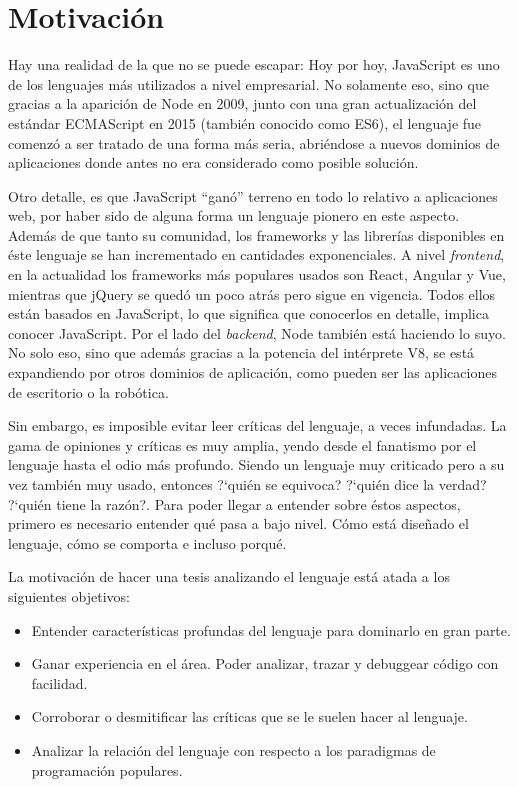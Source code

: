 \section{Motivación}

Hay una realidad de la que no se puede escapar: Hoy por hoy, JavaScript es uno de los lenguajes más utilizados a nivel empresarial. No solamente eso, sino que gracias a la aparición de Node en 2009, junto con una gran actualización del estándar ECMAScript en 2015 (también conocido como ES6), el lenguaje fue comenzó a ser tratado de una forma más seria, abriéndose a nuevos dominios de aplicaciones donde antes no era considerado como posible solución.

Otro detalle, es que JavaScript "`ganó"' terreno en todo lo relativo a aplicaciones web, por haber sido de alguna forma un lenguaje pionero en este aspecto. Además de que tanto su comunidad, los frameworks y las librerías disponibles en éste lenguaje se han incrementado en cantidades exponenciales. A nivel \textit{frontend}, en la actualidad los frameworks más populares usados son React, Angular y Vue, mientras que jQuery se quedó un poco atrás pero sigue en vigencia. Todos ellos están basados en JavaScript, lo que significa que conocerlos en detalle, implica conocer JavaScript. Por el lado del \textit{backend}, Node también está haciendo lo suyo. No solo eso, sino que además gracias a la potencia del intérprete V8, se está expandiendo por otros dominios de aplicación, como pueden ser las aplicaciones de escritorio o la robótica.

Sin embargo, es imposible evitar leer críticas del lenguaje, a veces infundadas. La gama de opiniones y críticas es muy amplia, yendo desde el fanatismo por el lenguaje hasta el odio más profundo. Siendo un lenguaje muy criticado pero a su vez también muy usado, entonces ?`quién se equivoca? ?`quién dice la verdad? ?`quién tiene la razón?. Para poder llegar a entender sobre éstos aspectos, primero es necesario entender qué pasa a bajo nivel. Cómo está diseñado el lenguaje, cómo se comporta e incluso porqué.

La motivación de hacer una tesis analizando el lenguaje está atada a los siguientes objetivos:

\begin{itemize}
\item Entender características profundas del lenguaje para dominarlo en gran parte.
\item Ganar experiencia en el área. Poder analizar, trazar y debuggear código con facilidad.
\item Corroborar o desmitificar las críticas que se le suelen hacer al lenguaje.
\item Analizar la relación del lenguaje con respecto a los paradigmas de programación populares.
\end{itemize}